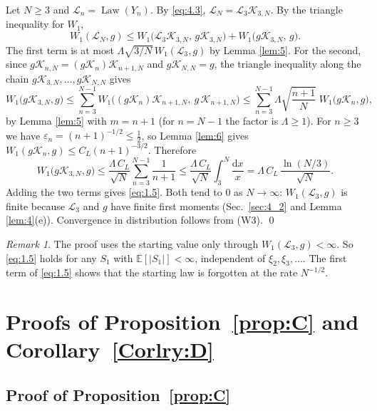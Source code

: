 \documentclass[aip,jmp,preprint,onecolumn,floatfix,superscriptaddress,nofootinbib,11pt]{revtex4-2}
\theoremstyle{plain}
\theoremstyle{remark}
\newtheorem*{remark}{Remark}
\numberwithin{equation}{section}
\newcommand{\dd}{\mathrm{d}}
\newcommand{\E}{\mathbb{E}}
\newcommand{\eps}{\varepsilon}
\newcommand{\Law}{\operatorname{Law}}
\begin{document}
Let $N\ge3$ and $\mathcal L_n=\Law(Y_n)$. By \eqref{eq:4.3}, $\mathcal L_N=\mathcal L_3\mathcal K_{3,N}$. By the triangle inequality for $W_1$,
%
\begin{equation*}
W_1(\mathcal L_N,g)\le W_1\big(\mathcal L_3\mathcal K_{3,N},\,g\mathcal K_{3,N}\big)+W_1\big(g\mathcal K_{3,N},\,g\big).
\end{equation*}
%
The first term is at most $\Lambda\sqrt{3/N}\,W_1(\mathcal L_3,g)$ by Lemma \ref{lem:5}. For the second, since $g\mathcal K_{n,N}=(g\mathcal K_n)\mathcal K_{n+1,N}$ and $g\mathcal K_{N,N}=g$, the triangle inequality along the chain $g\mathcal K_{3,N},\dots,g\mathcal K_{N,N}$ gives
%
\begin{equation*}
W_1\big(g\mathcal K_{3,N},g\big)\le\sum_{n=3}^{N-1}W_1\big((g\mathcal K_n)\mathcal K_{n+1,N},\ g\,\mathcal K_{n+1,N}\big)\le\sum_{n=3}^{N-1}\Lambda\sqrt{\frac{n+1}{N}}\;W_1\big(g\mathcal K_n,g\big),
\end{equation*}
%
by Lemma \ref{lem:5} with $m=n+1$ (for $n=N-1$ the factor is $\Lambda\ge1$). For $n\ge3$ we have $\eps_n=(n+1)^{-1/2}\le\tfrac12$, so Lemma \ref{lem:6} gives $W_1(g\mathcal K_n,g)\le C_L(n+1)^{-3/2}$. Therefore
%
\begin{equation*}
W_1\big(g\mathcal K_{3,N},g\big)\le\frac{\Lambda\,C_L}{\sqrt N}\sum_{n=3}^{N-1}\frac{1}{n+1}\le\frac{\Lambda\,C_L}{\sqrt N}\int_3^N\frac{\dd x}{x}=\Lambda\,C_L\,\frac{\ln(N/3)}{\sqrt N}.
\end{equation*}
%
Adding the two terms gives \eqref{eq:1.5}. Both tend to $0$ as $N\to\infty$: $W_1(\mathcal L_3,g)$ is finite because $\mathcal L_3$ and $g$ have finite first moments (Sec.~\ref{sec:4_2} and Lemma \ref{lem:4}(e)). Convergence in distribution follows from (W3). \qed
 
\begin{remark}
The proof uses the starting value only through $W_1(\mathcal L_3,g)<\infty$. So \eqref{eq:1.5} holds for any $S_1$ with $\E[|S_1|]<\infty$, independent of $\xi_2,\xi_3,\dots$. The first term of \eqref{eq:1.5} shows that the starting law is forgotten at the rate $N^{-1/2}$.
\end{remark}
 
\section{Proofs of Proposition~\ref{prop:C} and Corollary~\ref{Corlry:D}}\label{sec:5}
 
\subsection{Proof of Proposition~\ref{prop:C}}\label{sec:5_1}
 
\end{document}
